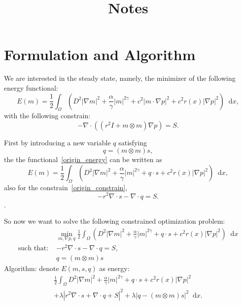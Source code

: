 \documentclass{article}
\theoremstyle{plain}
\theoremstyle{remark}
\theoremstyle{remark}
\theoremstyle{remark}
\numberwithin{equation}{section}
\newcommand*\diff{\mathop{}\!\mathrm{d}}
\begin{document}
\title{Notes}

\author{}

\maketitle

\section{Formulation and Algorithm}

We are interested in the steady state, namely, the minimizer of the following energy functional:
\begin{equation}\label{origin_energy}
  E(m) = \frac{1}{2}\int_\Omega \left(D^2|\nabla m|^2 + \frac{\alpha}{\gamma}|m|^{2\gamma} + c^2|m\cdot\nabla p|^2 + c^2r(x) |\nabla p|^2\right) \diff x,
\end{equation}
with the following constrain:
\begin{equation}\label{origin_constrain}
  -\nabla\cdot\left((r^2 I + m\otimes m)\nabla p\right) = S.
\end{equation}

First by introducing a new variable $q$ satisfying
\begin{equation}
  q = (m\otimes m) s,
\end{equation}
the the functional~\eqref{origin_energy} can be written as
\begin{equation}\label{origin_energy}
  E(m) = \frac{1}{2}\int_\Omega \left(D^2|\nabla m|^2 + \frac{\alpha}{\gamma}|m|^{2\gamma} + q\cdot s + c^2r(x) |\nabla p|^2\right) \diff x,
\end{equation}
also for the constrain~\eqref{origin_constrain},
\begin{equation}
  -r^2\nabla \cdot s - \nabla\cdot q = S.
\end{equation}.

So now we want to solve the following constrained optimization problem:
\begin{align}
  &\min_{m,\nabla p,q}
  \frac{1}{2}\int_\Omega\left(D^2|\nabla m|^2 + \frac{\alpha}{\gamma}|m|^{2\gamma} + q\cdot s + c^2r(x) |\nabla p|^2\right) \diff x \\
  \text{such that: } &-r^2\nabla\cdot s - \nabla\cdot q = S, \\
  &q = (m\otimes m)s
\end{align}
Algorithm: denote $E(m, s, q)$ as energy:
\begin{multline}
  \frac{1}{2}\int_\Omega D^2|\nabla m|^2 + \frac{\alpha}{\gamma}|m|^{2\gamma} + q\cdot s + c^2r(x) |\nabla p|^2 \\
  + \lambda |r^2\nabla\cdot s + \nabla\cdot q + S|^2 + \lambda|q - (m\otimes m) s|^2 \diff x.
\end{multline}
\end{document}
